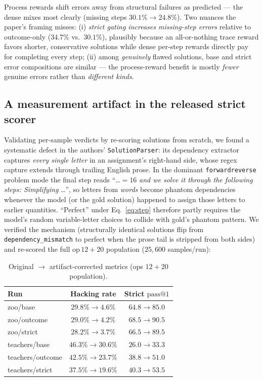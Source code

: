 \documentclass[11pt]{article}
\makeatletter
\newcommand{\passk}[1]{\ensuremath{\mathrm{pass}@#1}}
\makeatother
\begin{document}
Process rewards shift errors away from structural failures as predicted --- the dense
mixes most clearly (missing steps $30.1\% \to 24.8\%$). Two nuances the paper's framing
misses: (i) \emph{strict gating increases missing-step errors} relative to outcome-only
($34.7\%$ vs.\ $30.1\%$), plausibly because an all-or-nothing trace reward favors
shorter, conservative solutions while dense per-step rewards directly pay for
completing every step; (ii) among \emph{genuinely} flawed solutions, base and strict
error compositions are similar --- the process-reward benefit is mostly \emph{fewer}
genuine errors rather than \emph{different kinds}.

\subsection{A measurement artifact in the released strict scorer}
\label{sec:artifact}

Validating per-sample verdicts by re-scoring solutions from scratch, we found a
systematic defect in the authors' \texttt{SolutionParser}: its dependency extractor
captures \emph{every single letter} in an assignment's right-hand side, whose regex
capture extends through trailing English prose. In the dominant
\texttt{forwardreverse} problem mode the final step reads
``\dots $= 16$ \emph{and we solve it through the following steps: Simplifying} \dots'',
so letters from \emph{words} become phantom dependencies whenever the model (or the
gold solution) happened to assign those letters to earlier quantities.
``Perfect'' under Eq.~\eqref{eq:step} therefore partly requires the model's random
variable-letter choices to collide with gold's phantom pattern. We verified the
mechanism (structurally identical solutions flip from \texttt{dependency\_mismatch}
to perfect when the prose tail is stripped from both sides) and re-scored the full
$\mathrm{op}\,12+20$ population ($25{,}600$ samples/run):

\begin{table}[h]
\centering
\caption{Original $\to$ artifact-corrected metrics (ops $12{+}20$ population).}
\label{tab:corrected}
\small
\begin{tabular}{lcc}
\toprule
Run & Hacking rate & Strict \passk{1} \\
\midrule
zoo/base         & $29.8\% \to 4.6\%$  & $64.8 \to 85.0$ \\
zoo/outcome      & $29.0\% \to 4.2\%$  & $68.5 \to 90.5$ \\
zoo/strict       & $28.2\% \to 3.7\%$  & $66.5 \to 89.5$ \\
teachers/base    & $46.3\% \to 30.6\%$ & $26.0 \to 33.3$ \\
teachers/outcome & $42.5\% \to 23.7\%$ & $38.8 \to 51.0$ \\
teachers/strict  & $37.5\% \to 19.6\%$ & $40.3 \to 53.5$ \\
\bottomrule
\end{tabular}
\end{table}
\end{document}
